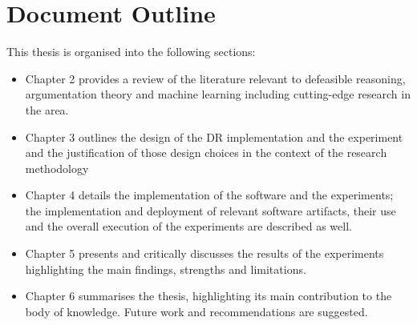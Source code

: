 \section{Document Outline}

This thesis is organised into the following sections:

\begin{itemize}

  \item Chapter 2 provides a review of the literature relevant to defeasible reasoning, argumentation theory and machine learning including cutting-edge research in the area.
  \item Chapter 3 outlines the design of the DR implementation and the experiment and the justification of those design choices in the context of the research methodology
  \item Chapter 4 details the implementation of the software and the experiments; the implementation and deployment of relevant software artifacts, their use and the overall execution of the experiments are described as well.
  \item Chapter 5 presents and critically discusses the results of the experiments highlighting the main findings, strengths and limitations.
  \item Chapter 6 summarises the thesis, highlighting its main contribution to the body of knowledge. Future work and recommendations are suggested.

\end{itemize}
